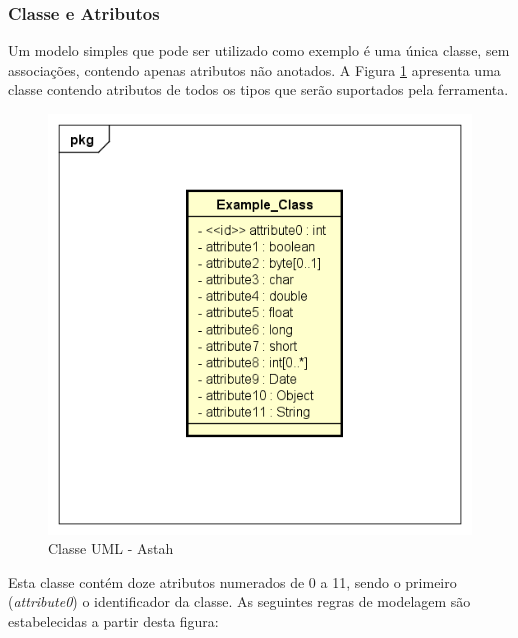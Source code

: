 
\subsubsection{Classe e Atributos}

Um modelo simples que pode ser utilizado como exemplo é uma única classe, sem associações, contendo apenas atributos não anotados. A Figura \ref{fig_example_class} apresenta uma classe contendo atributos de todos os tipos que serão suportados pela ferramenta.

\begin{figure}[htb]
    \begin{center}
        \includegraphics[scale=0.7]{imagens/Example_Class.png}
    \end{center}
	\caption{\label{fig_example_class}Classe UML - Astah}
\end{figure}

Esta classe contém doze atributos numerados de 0 a 11, sendo o primeiro (\textit{attribute0}) o identificador da classe. As seguintes regras de modelagem são estabelecidas a partir desta figura:

